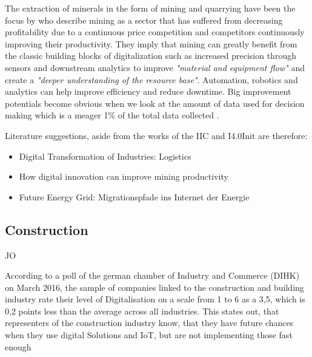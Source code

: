 The extraction of minerals in the form of mining and quarrying have been the focus by \citeauthor{mckinseymining:2015} who describe mining as a sector that has suffered from decreasing profitability due to a continuous price competition and competitors continuously improving their productivity. They imply that mining can greatly benefit from the classic building blocks of digitalization such as increased precision through sensors and downstream analytics to improve \emph{"material and equipment flow"} and create a \emph{"deeper understanding of the resource base"}. Automation, robotics and analytics can help improve efficiency and reduce downtime. Big improvement potentials become obvious when we look at the amount of data used for decision making which is a meager 1\% of the total data collected \cite[p.7]{mckinseymining:2015}. 

Literature suggestions, aside from the works of the \ac{IIC} and \ac{I4.0Init} are therefore:

\begin{itemize}
\item Digital Transformation of Industries: Logistics \cite{worldforumlogistics:2016}
\item How digital innovation can improve mining productivity \cite{mckinseymining:2015}
\item Future Energy Grid: Migrationspfade ins Internet der Energie \cite{AppelrathKagermannMayer2012}
\end{itemize}



\subsection{Construction}
JO


According to a poll of the german chamber of Industry and Commerce (\ac{DIHK}) on March 2016, the sample of companies linked to the construction and building industry rate their level of Digitalisation on a scale from 1 to 6 as a 3,5, which is 0,2 points less than the average across all industries. This states out, that representers of the construction industry know, that they have future chances when they use digital Solutions and \ac{IoT}, but are not implementing those fast enough %

